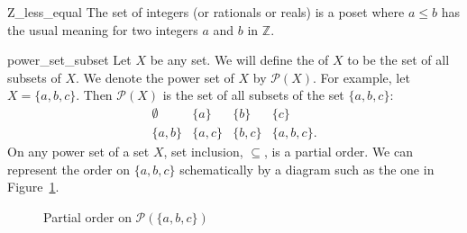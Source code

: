 \begin{example}{Z_less_equal}
The set of integers (or rationals  or reals) is a poset where $a \leq  b$ has the usual meaning for two integers $a$ and $b$ in ${\mathbb Z}$.
\end{example}


\begin{example}{power_set_subset}
Let $X$ be any set.  We will define the  of $X$ to be the set of all subsets of $X$. We denote the power set of $X$ by ${\mathcal P}(X)$. For example, let $X = \{ a, b, c \}$.  Then ${\mathcal P}(X)$ is  the set of all subsets of the set  $\{ a, b, c \}$: 
\[
\begin{array}{cccc}
\emptyset & \{ a \} & \{ b \} & \{ c \} \\
\{ a, b \} & \{ a, c\} &\{ b, c\} & \{ a, b, c \}.
\end{array}
\]
On any power set of a set $X$, set inclusion, $\subseteq$, is a partial order.  We can represent the order on $\{ a, b, c \}$ schematically by a diagram such as the one in  Figure~\ref{partial}. 
\end{example}

\begin{figure}[htb]
\begin{center}
\end{center}
\caption{Partial order on ${\mathcal P}( \{ a, b, c \})$}
\label{partial}
\end{figure}


